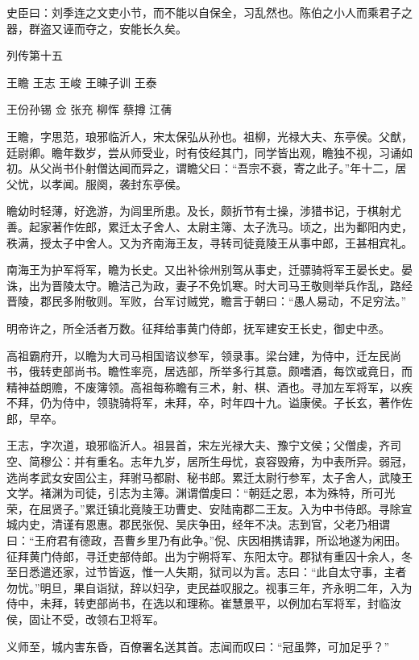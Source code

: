 \documentclass[12pt,UTF8]{ctexbook}
\begin{document}
史臣曰：刘季连之文吏小节，而不能以自保全，习乱然也。陈伯之小人而乘君子之器，群盗又诬而夺之，安能长久矣。





列传第十五

王瞻 王志 王峻 王暕子训 王泰

王份孙锡 佥 张充 柳恽 蔡撙 江蒨

王瞻，字思范，琅邪临沂人，宋太保弘从孙也。祖柳，光禄大夫、东亭侯。父猷，廷尉卿。瞻年数岁，尝从师受业，时有伎经其门，同学皆出观，瞻独不视，习诵如初。从父尚书仆射僧达闻而异之，谓瞻父曰：“吾宗不衰，寄之此子。”年十二，居父忧，以孝闻。服阕，袭封东亭侯。

瞻幼时轻薄，好逸游，为闾里所患。及长，颇折节有士操，涉猎书记，于棋射尤善。起家著作佐郎，累迁太子舍人、太尉主簿、太子洗马。顷之，出为鄱阳内史，秩满，授太子中舍人。又为齐南海王友，寻转司徒竟陵王从事中郎，王甚相宾礼。

南海王为护军将军，瞻为长史。又出补徐州别驾从事史，迁骠骑将军王晏长史。晏诛，出为晋陵太守。瞻洁己为政，妻子不免饥寒。时大司马王敬则举兵作乱，路经晋陵，郡民多附敬则。军败，台军讨贼党，瞻言于朝曰：“愚人易动，不足穷法。”

明帝许之，所全活者万数。征拜给事黄门侍郎，抚军建安王长史，御史中丞。

高祖霸府开，以瞻为大司马相国谘议参军，领录事。梁台建，为侍中，迁左民尚书，俄转吏部尚书。瞻性率亮，居选部，所举多行其意。颇嗜酒，每饮或竟日，而精神益朗赡，不废簿领。高祖每称瞻有三术，射、棋、酒也。寻加左军将军，以疾不拜，仍为侍中，领骁骑将军，未拜，卒，时年四十九。谥康侯。子长玄，著作佐郎，早卒。

王志，字次道，琅邪临沂人。祖昙首，宋左光禄大夫、豫宁文侯；父僧虔，齐司空、简穆公：并有重名。志年九岁，居所生母忧，哀容毁瘠，为中表所异。弱冠，选尚孝武女安固公主，拜驸马都尉、秘书郎。累迁太尉行参军，太子舍人，武陵王文学。褚渊为司徒，引志为主簿。渊谓僧虔曰：“朝廷之恩，本为殊特，所可光荣，在屈贤子。”累迁镇北竟陵王功曹史、安陆南郡二王友。入为中书侍郎。寻除宣城内史，清谨有恩惠。郡民张倪、吴庆争田，经年不决。志到官，父老乃相谓曰：“王府君有德政，吾曹乡里乃有此争。”倪、庆因相携请罪，所讼地遂为闲田。征拜黄门侍郎，寻迁吏部侍郎。出为宁朔将军、东阳太守。郡狱有重囚十余人，冬至日悉遣还家，过节皆返，惟一人失期，狱司以为言。志曰：“此自太守事，主者勿忧。”明旦，果自诣狱，辞以妇孕，吏民益叹服之。视事三年，齐永明二年，入为侍中，未拜，转吏部尚书，在选以和理称。崔慧景平，以例加右军将军，封临汝侯，固让不受，改领右卫将军。

义师至，城内害东昏，百僚署名送其首。志闻而叹曰：“冠虽弊，可加足乎？”
\end{document}
